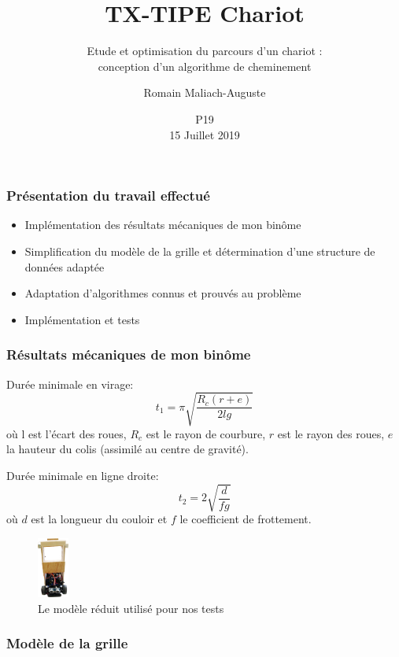 \documentclass[frenchb]{beamer}
\title{TX-TIPE Chariot}
\subtitle{Etude et optimisation du parcours d'un chariot :\\conception d'un algorithme de cheminement}
\date{P19\\15 Juillet 2019}
\institute{Lycée Pierre d'Ailly - Université de Technologie de Compiègne}
\author{Romain Maliach-Auguste}
\begin{document}
\frame{\titlepage}
  \begin{frame}
    \frametitle{Présentation du travail effectué}
	  \begin{itemize}
			 \item Implémentation des résultats mécaniques de mon binôme
			 \item Simplification du modèle de la grille et détermination d'une structure de données adaptée
			 \item Adaptation d'algorithmes connus et prouvés au problème
			 \item Implémentation et tests
	  \end{itemize}
  \end{frame}
  \begin{frame}
	  \frametitle{Résultats mécaniques de mon binôme}
		Durée minimale en virage:\[t_1 = \pi\sqrt{\frac{R_c(r+e)}{2lg}}\]
		où l est l'écart des roues, $R_c$ est le rayon de courbure, $r$ est le rayon des roues, $e$ la hauteur du colis (assimilé au centre de gravité).

		Durée minimale en ligne droite:
		\[t_2=2\sqrt{\frac{d}{fg}}\]
		où $d$ est la longueur du couloir et $f$ le coefficient de frottement.
	 
	  \begin{figure}
		  \centering
		  \includegraphics[height=2cm]{protoChariot.png}
		  \caption{Le modèle réduit utilisé pour nos tests}
	  \end{figure}
  \end{frame}
  \begin{frame}
	  \frametitle{Modèle de la grille}
  \end{frame}
\end{document}
